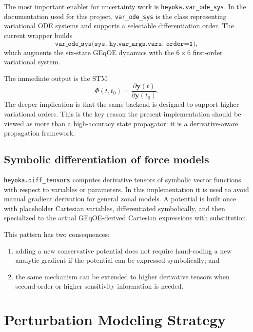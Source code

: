 \documentclass[11pt]{article}
\begin{document}
The most important enabler for uncertainty work is
\texttt{heyoka.var\_ode\_sys}. In the documentation used for this project,
\texttt{var\_ode\_sys} is the class representing variational ODE systems and
supports a selectable differentiation order. The current wrapper builds
\begin{equation}
\texttt{var\_ode\_sys(sys, hy.var\_args.vars, order=1)},
\end{equation}
which augments the six-state GEqOE dynamics with the $6 \times 6$ first-order
variational system.

The immediate output is the STM
\begin{equation}
\Phi(t,t_0) = \frac{\partial \bm{y}(t)}{\partial \bm{y}(t_0)}.
\end{equation}
The deeper implication is that the same backend is designed to support higher
variational orders. This is the key reason the present implementation should be
viewed as more than a high-accuracy state propagator: it is a derivative-aware
propagation framework.

\subsection{Symbolic differentiation of force models}

\texttt{heyoka.diff\_tensors} computes derivative tensors of symbolic vector
functions with respect to variables or parameters. In this implementation it is
used to avoid manual gradient derivation for general zonal models. A potential
is built once with placeholder Cartesian variables, differentiated
symbolically, and then specialized to the actual GEqOE-derived Cartesian
expressions with substitution.

This pattern has two consequences:
\begin{enumerate}
    \item adding a new conservative potential does not require hand-coding a
    new analytic gradient if the potential can be expressed symbolically; and
    \item the same mechanism can be extended to higher derivative tensors when
    second-order or higher sensitivity information is needed.
\end{enumerate}

\section{Perturbation Modeling Strategy}
\end{document}
